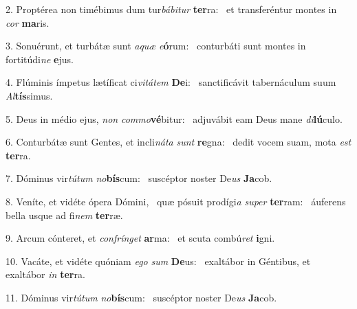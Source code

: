 2. Proptérea non timébimus dum tur\textit{bá}\textit{bi}\textit{tur} \textbf{ter}ra: \ast\  et transferéntur montes in \textit{cor} \textbf{ma}ris.\

3. Sonuérunt, et turbátæ sunt \textit{a}\textit{quæ} \textit{e}\textbf{ó}rum: \ast\  conturbáti sunt montes in fortitúdi\textit{ne} \textbf{e}jus.\

4. Flúminis ímpetus lætíficat ci\textit{vi}\textit{tá}\textit{tem} \textbf{De}i: \ast\  sanctificávit tabernáculum suum \textit{Al}\textbf{tís}simus.\

5. Deus in médio ejus, \textit{non} \textit{com}\textit{mo}\textbf{vé}bitur: \ast\  adjuvábit eam Deus mane \textit{di}\textbf{lú}culo.\

6. Conturbátæ sunt Gentes, et incli\textit{ná}\textit{ta} \textit{sunt} \textbf{re}gna: \ast\  dedit vocem suam, mota \textit{est} \textbf{ter}ra.\

7. Dóminus vir\textit{tú}\textit{tum} \textit{no}\textbf{bís}cum: \ast\  suscéptor noster De\textit{us} \textbf{Ja}cob.\

8. Veníte, et vidéte ópera Dómini, \dag\  quæ pósuit prodígi\textit{a} \textit{su}\textit{per} \textbf{ter}ram: \ast\  áuferens bella usque ad fi\textit{nem} \textbf{ter}ræ.\

9. Arcum cónteret, et \textit{con}\textit{frín}\textit{get} \textbf{ar}ma: \ast\  et scuta combú\textit{ret} \textbf{i}gni.\

10. Vacáte, et vidéte quóniam \textit{e}\textit{go} \textit{sum} \textbf{De}us: \ast\  exaltábor in Géntibus, et exaltábor \textit{in} \textbf{ter}ra.\

11. Dóminus vir\textit{tú}\textit{tum} \textit{no}\textbf{bís}cum: \ast\  suscéptor noster De\textit{us} \textbf{Ja}cob.\

